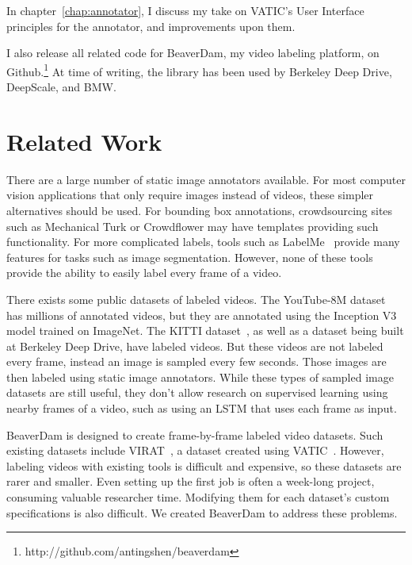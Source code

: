 In chapter~\ref{chap:annotator}, I discuss my take on VATIC's User Interface principles for the annotator, and improvements upon them.

I also release all related code for BeaverDam, my video labeling platform, on Github.\footnote{http://github.com/antingshen/beaverdam} At time of writing, the library has been used by Berkeley Deep Drive, DeepScale, and BMW.

\section*{Related Work}
\label{sec:related}

There are a large number of static image annotators available.
For most computer vision applications that only require images instead of videos, these simpler alternatives should be used.
For bounding box annotations, crowdsourcing sites such as Mechanical Turk or Crowdflower may have templates providing such functionality.
For more complicated labels, tools such as LabelMe~\cite{LabelMe} provide many features for tasks such as image segmentation.
However, none of these tools provide the ability to easily label every frame of a video.

There exists some public datasets of labeled videos.
The YouTube-8M dataset~\cite{YouTube-8M} has millions of annotated videos, but they are annotated using the Inception V3 model trained on ImageNet.
The KITTI dataset~\cite{KITTI}, as well as a dataset being built at Berkeley Deep Drive, have labeled videos.
But these videos are not labeled every frame, instead an image is sampled every few seconds.
Those images are then labeled using static image annotators.
While these types of sampled image datasets are still useful, they don't allow research on supervised learning using nearby frames of a video, such as using an LSTM that uses each frame as input.

BeaverDam is designed to create frame-by-frame labeled video datasets.
Such existing datasets include VIRAT~\cite{virat}, a dataset created using VATIC~\cite{Vatic}.
However, labeling videos with existing tools is difficult and expensive, so these datasets are rarer and smaller.
Even setting up the first job is often a week-long project, consuming valuable researcher time.
Modifying them for each dataset's custom specifications is also difficult.
We created BeaverDam to address these problems.

